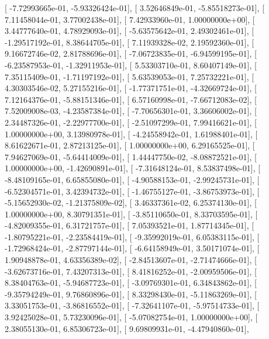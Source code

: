 \documentclass{article}
\begin{document}
       [ -7.72993665e-01,  -5.93326424e-01],
       [  3.52646849e-01,  -5.85518273e-01],
       [  7.11458044e-01,   3.77002438e-01],
       [  7.42933960e-01,   1.00000000e+00],
       [  3.44777640e-01,   4.78929093e-01],
       [ -5.63575642e-01,   2.49302461e-01],
       [ -1.29517192e-01,   8.38644705e-01],
       [  7.11939328e-02,   2.19592360e-01],
       [  9.16672746e-02,   2.81788696e-01],
       [ -7.06723835e-01,  -6.94599195e-01],
       [ -6.23587953e-01,  -1.32911953e-01],
       [  5.53303710e-01,   8.60407149e-01],
       [  7.35115409e-01,  -1.71197192e-01],
       [  5.63539053e-01,   7.25732221e-01],
       [  4.30303546e-02,   5.27155216e-01],
       [ -1.77371751e-01,  -4.32669724e-01],
       [  7.12164376e-01,  -5.88151346e-01],
       [  6.57160998e-01,  -7.66712083e-02],
       [  7.52009008e-03,  -4.23587384e-01],
       [ -7.70656301e-01,   3.36606002e-01],
       [  2.34487326e-01,  -2.22977700e-01],
       [ -2.51097299e-01,   7.99416621e-01],
       [  1.00000000e+00,   3.13980978e-01],
       [ -4.24558942e-01,   1.61988401e-01],
       [  8.61622671e-01,   2.87213125e-01],
       [  1.00000000e+00,   6.29165525e-01],
       [  7.94627069e-01,  -5.64414009e-01],
       [  1.44447750e-02,  -8.08872521e-01],
       [  1.00000000e+00,  -1.42690891e-01],
       [ -7.31648124e-01,   8.53837498e-01],
       [ -8.48109165e-01,   6.65855080e-01],
       [ -4.90588153e-01,  -2.99245731e-01],
       [ -6.52304571e-01,   3.42394732e-01],
       [ -1.46755127e-01,  -3.86753973e-01],
       [ -5.15652930e-02,  -1.21375809e-02],
       [  3.46337361e-02,   6.25374130e-01],
       [  1.00000000e+00,   8.30791351e-01],
       [ -3.85110650e-01,   8.33703595e-01],
       [ -4.82009355e-01,   6.31721757e-01],
       [  7.05393521e-01,   1.87714345e-01],
       [ -1.80795221e-01,  -2.23584419e-01],
       [ -9.35992019e-01,   6.05383115e-01],
       [ -1.72968424e-01,  -2.87797144e-01],
       [ -6.64158949e-01,   3.50171074e-01],
       [  1.90948878e-01,   4.63356389e-02],
       [ -2.84513607e-01,  -2.71474666e-01],
       [ -3.62673716e-01,   7.43207313e-01],
       [  8.41816252e-01,  -2.00959506e-01],
       [  8.38404763e-01,  -5.94687723e-01],
       [ -3.09769301e-01,   6.34843862e-01],
       [ -9.35794249e-01,   9.76860896e-01],
       [  8.33298430e-01,  -5.11863269e-01],
       [  3.33051753e-01,  -3.86816552e-01],
       [ -7.32641107e-01,  -5.97514733e-01],
       [  3.92425028e-01,   5.73230096e-01],
       [ -5.07082754e-01,   1.00000000e+00],
       [  2.38055130e-01,   6.85306723e-01],
       [  9.69809931e-01,  -4.47940860e-01],
\end{document}
